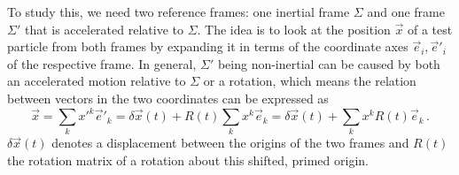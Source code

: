 \documentclass[../class_mech_main.tex]{subfiles}
\begin{document}
To study this, we need two reference frames: one inertial frame $\Sigma$ and one frame $\Sigma'$ that is accelerated relative to $\Sigma$. The idea is to look at the position $\vec{x}$ of a test particle from both frames by expanding it in terms of the coordinate axes $\vec{e}_i, \vec{e}'_i$ of the respective frame. In general, $\Sigma'$ being non-inertial can be caused by both an accelerated motion relative to $\Sigma$ or a rotation, which means the relation between vectors in the two coordinates can be expressed as
\begin{equation}
	\vec{x} = \sum_k x'^k \vec{e}'_k = \delta \vec{x}(t) + R(t) \sum_k x^k \vec{e}_k = \delta \vec{x}(t) + \sum_k x^k R(t) \vec{e}_k \, .
\end{equation}
$\delta \vec{x}(t)$ denotes a displacement between the origins of the two frames and $R(t)$ the rotation matrix of a rotation about this shifted, primed origin.
\end{document}
